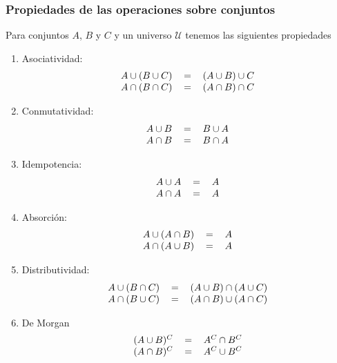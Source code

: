 \documentclass[../main.tex]{subfiles}
\begin{document}
\subsubsection{Propiedades de las operaciones sobre conjuntos}
Para conjuntos $A$, $B$ y $C$ y un universo $\mathcal{U}$ tenemos las siguientes propiedades
\begin{enumerate}
    \item Asociatividad:
    \[
        \begin{tabular}{rcl}
            $A \cup (B \cup C)$ & $=$ & $(A \cup B) \cup C$ \\
            $A \cap (B \cap C)$ & $=$ & $(A \cap B) \cap C$ \\
        \end{tabular}
    \]
    \item Conmutatividad:
    \[
        \begin{tabular}{rcl}
            $A \cup B$ & $=$ & $B \cup A$ \\
            $A \cap B$ & $=$ & $B \cap A$ \\
        \end{tabular}
    \]
    \item Idempotencia:
    \[
        \begin{tabular}{rcl}
            $A \cup A$ & $=$ & $A$ \\
            $A \cap A$ & $=$ & $A$ \\
        \end{tabular}
    \]
    \item Absorción:
    \[
        \begin{tabular}{rcl}
            $A \cup (A \cap B)$ & $=$ & $A$ \\
            $A \cap (A \cup B)$ & $=$ & $A$ \\
        \end{tabular}
    \]
    \item Distributividad:
    \[
        \begin{tabular}{rcl}
            $A \cup (B \cap C)$ & $=$ & $(A \cup B) \cap (A \cup C)$ \\
            $A \cap (B \cup C)$ & $=$ & $(A \cap B) \cup (A \cap C)$ \\
        \end{tabular}
    \]
    \item De Morgan
    \[
        \begin{tabular}{rcl}
            $(A \cup B)^C$ & $=$ & $A^C \cap B^C$ \\
            $(A \cap B)^C$ & $=$ & $A^C \cup B^C$ \\

\end{tabular}\]
\end{enumerate}
\end{document}
